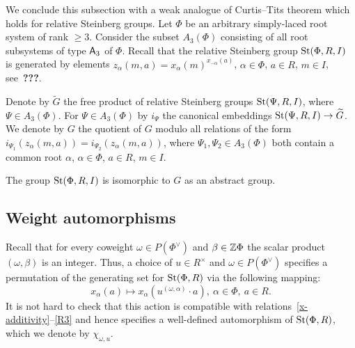 We conclude this subsection with a weak analogue of Curtis--Tits theorem which holds for relative Steinberg groups.
Let $\Phi$ be an arbitrary simply-laced root system of rank $\geq 3$.
Consider the subset $A_3(\Phi)$ consisting of all root subsystems of type $\mathsf{A}_3$ of $\Phi$.
Recall that the relative Steinberg group $\operatorname{St}(\Phi, R, I)$ is generated by elements $z_\alpha(m, a) = x_\alpha(m)^{x_{-\alpha}(a)}$, $\alpha \in \Phi$, $a \in R$, $m \in I$, see~\textbf{???}.

Denote by $\widetilde{G}$ the free product of relative Steinberg groups $\operatorname{St}(\Psi, R, I)$, where $\Psi \in A_3(\Phi)$.
For $\Psi \in A_3(\Phi)$ by $i_\Psi$ the canonical embeddings $\operatorname{St}(\Psi, R, I) \to \widetilde{G}$.
We denote by $G$ the quotient of $G$ modulo all relations of the form $i_{\Psi_1}(z_\alpha(m, a)) = i_{\Psi_2}(z_\alpha(m, a))$,
 where $\Psi_1, \Psi_2 \in A_3(\Phi)$ both contain a common root $\alpha$, $\alpha \in \Phi$, $a\in R$, $m \in I$.

\begin{thm}\label{relPres} The group $\operatorname{St}(\Phi, R, I)$ is isomorphic to $G$ as an abstract group. \end{thm}

\subsection{Weight automorphisms}\label{subsec:weight-automorphisms}
Recall that for every coweight $\omega \in P(\Phi^\vee)$ and $\beta \in \mathbb{Z} \Phi$ the scalar product $(\omega, \beta)$ is an integer.
Thus, a choice of $u \in R^\times$ and $\omega \in P(\Phi^\vee)$ specifies a permutation of the generating set for $\operatorname{St}(\Phi, R)$ via the following mapping:
\begin{equation*} x_\alpha(a) \mapsto x_\alpha(u^{(\omega, \alpha)} \cdot a),\ \alpha\in \Phi,\ a \in R. \end{equation*}
It is not hard to check that this action is compatible with relations~\eqref{x-additivity}--\eqref{R3} and hence specifies a well-defined automorphism of $\operatorname{St}(\Phi, R)$, which we denote by $\chi_{\omega, u}$.

